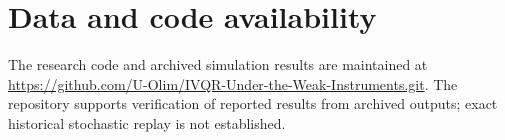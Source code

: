 \section*{Data and code availability}
\ifdefined\WfourAnonymous
\WfourRepository
\else
The research code and archived simulation results are maintained at \url{https://github.com/U-Olim/IVQR-Under-the-Weak-Instruments.git}. The repository supports verification of reported results from archived outputs; exact historical stochastic replay is not established.
\fi
